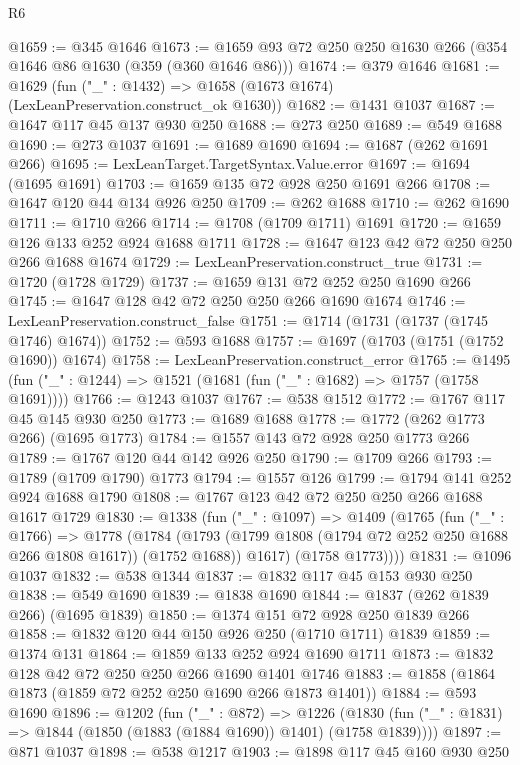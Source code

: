 \begin{lexlean}{R6}
\begin{coremodule}
@1659 := @345 @1646
@1673 := @1659 @93 @72 @250 @250 @1630 @266 (@354 @1646 @86 @1630 (@359 (@360 @1646 @86)))
@1674 := @379 @1646
@1681 := @1629 (fun ("_" : @1432) => @1658 (@1673 @1674) (LexLeanPreservation.construct_ok @1630))
@1682 := @1431 @1037
@1687 := @1647 @117 @45 @137 @930 @250
@1688 := @273 @250
@1689 := @549 @1688
@1690 := @273 @1037
@1691 := @1689 @1690
@1694 := @1687 (@262 @1691 @266)
@1695 := LexLeanTarget.TargetSyntax.Value.error
@1697 := @1694 (@1695 @1691)
@1703 := @1659 @135 @72 @928 @250 @1691 @266
@1708 := @1647 @120 @44 @134 @926 @250
@1709 := @262 @1688
@1710 := @262 @1690
@1711 := @1710 @266
@1714 := @1708 (@1709 @1711) @1691
@1720 := @1659 @126 @133 @252 @924 @1688 @1711
@1728 := @1647 @123 @42 @72 @250 @250 @266 @1688 @1674
@1729 := LexLeanPreservation.construct_true
@1731 := @1720 (@1728 @1729)
@1737 := @1659 @131 @72 @252 @250 @1690 @266
@1745 := @1647 @128 @42 @72 @250 @250 @266 @1690 @1674
@1746 := LexLeanPreservation.construct_false
@1751 := @1714 (@1731 (@1737 (@1745 @1746) @1674))
@1752 := @593 @1688
@1757 := @1697 (@1703 (@1751 (@1752 @1690)) @1674)
@1758 := LexLeanPreservation.construct_error
@1765 := @1495 (fun ("_" : @1244) => @1521 (@1681 (fun ("_" : @1682) => @1757 (@1758 @1691))))
@1766 := @1243 @1037
@1767 := @538 @1512
@1772 := @1767 @117 @45 @145 @930 @250
@1773 := @1689 @1688
@1778 := @1772 (@262 @1773 @266) (@1695 @1773)
@1784 := @1557 @143 @72 @928 @250 @1773 @266
@1789 := @1767 @120 @44 @142 @926 @250
@1790 := @1709 @266
@1793 := @1789 (@1709 @1790) @1773
@1794 := @1557 @126
@1799 := @1794 @141 @252 @924 @1688 @1790
@1808 := @1767 @123 @42 @72 @250 @250 @266 @1688 @1617 @1729
@1830 := @1338
    (fun ("_" : @1097) =>
    @1409
      (@1765
        (fun ("_" : @1766) =>
        @1778
          (@1784
            (@1793 (@1799 @1808 (@1794 @72 @252 @250 @1688 @266 @1808 @1617)) (@1752 @1688))
            @1617)
          (@1758 @1773))))
@1831 := @1096 @1037
@1832 := @538 @1344
@1837 := @1832 @117 @45 @153 @930 @250
@1838 := @549 @1690
@1839 := @1838 @1690
@1844 := @1837 (@262 @1839 @266) (@1695 @1839)
@1850 := @1374 @151 @72 @928 @250 @1839 @266
@1858 := @1832 @120 @44 @150 @926 @250 (@1710 @1711) @1839
@1859 := @1374 @131
@1864 := @1859 @133 @252 @924 @1690 @1711
@1873 := @1832 @128 @42 @72 @250 @250 @266 @1690 @1401 @1746
@1883 := @1858 (@1864 @1873 (@1859 @72 @252 @250 @1690 @266 @1873 @1401))
@1884 := @593 @1690
@1896 := @1202
    (fun ("_" : @872) =>
    @1226 (@1830 (fun ("_" : @1831) => @1844 (@1850 (@1883 (@1884 @1690)) @1401) (@1758 @1839))))
@1897 := @871 @1037
@1898 := @538 @1217
@1903 := @1898 @117 @45 @160 @930 @250

\end{coremodule}
\end{lexlean}
